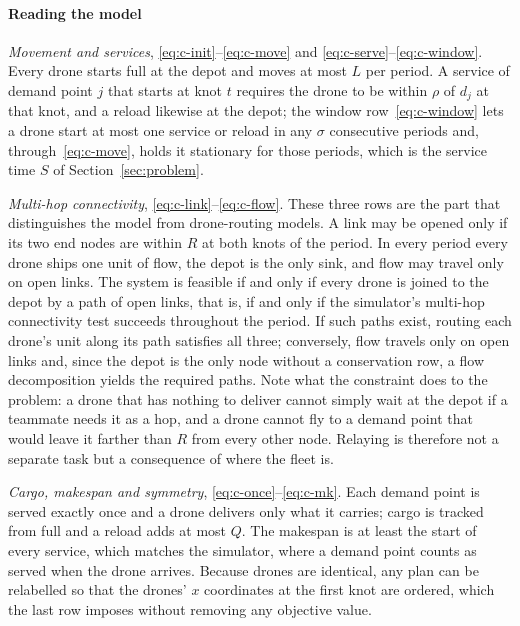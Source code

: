 \documentclass[final,5p,times,twocolumn]{elsarticle}
\begin{document}
\paragraph{Reading the model}
\emph{Movement and services}, \eqref{eq:c-init}--\eqref{eq:c-move} and
\eqref{eq:c-serve}--\eqref{eq:c-window}. Every drone starts full at the depot and moves at most
$L$ per period. A service of demand point $j$ that starts at knot $t$ requires the drone to be
within $\rho$ of $d_j$ at that knot, and a reload likewise at the depot; the window
row~\eqref{eq:c-window} lets a drone start at most one service or reload in any $\sigma$
consecutive periods and, through~\eqref{eq:c-move}, holds it stationary for those periods, which is
the service time $S$ of Section~\ref{sec:problem}.

\emph{Multi-hop connectivity}, \eqref{eq:c-link}--\eqref{eq:c-flow}. These three rows are the
part that distinguishes the model from drone-routing models. A link may be opened only if its two
end nodes are within $R$ at both knots of the period. In every period every drone ships one unit
of flow, the depot is the only sink, and flow may travel only on open links. The system is feasible
if and only if every drone is joined to the depot by a path of open links, that is, if and only if
the simulator's multi-hop connectivity test succeeds throughout the period. If such paths exist,
routing each drone's unit along its path satisfies all three; conversely, flow travels only on
open links and, since the depot is the only node without a conservation row, a flow decomposition
yields the required paths. Note what the constraint does to the problem: a drone that has nothing
to deliver cannot simply wait at the depot if a teammate needs it as a hop, and a drone cannot fly
to a demand point that would leave it farther than $R$ from every other node. Relaying is therefore
not a separate task but a consequence of where the fleet is.

\emph{Cargo, makespan and symmetry}, \eqref{eq:c-once}--\eqref{eq:c-mk}. Each demand point is
served exactly once and a drone delivers only what it carries; cargo is tracked from full and a
reload adds at most $Q$. The makespan is at least the start of every service, which matches the
simulator, where a demand point counts as served when the drone arrives. Because drones are
identical, any plan can be relabelled so that the drones' $x$ coordinates at the first knot are
ordered, which the last row imposes without removing any objective value.
\end{document}
